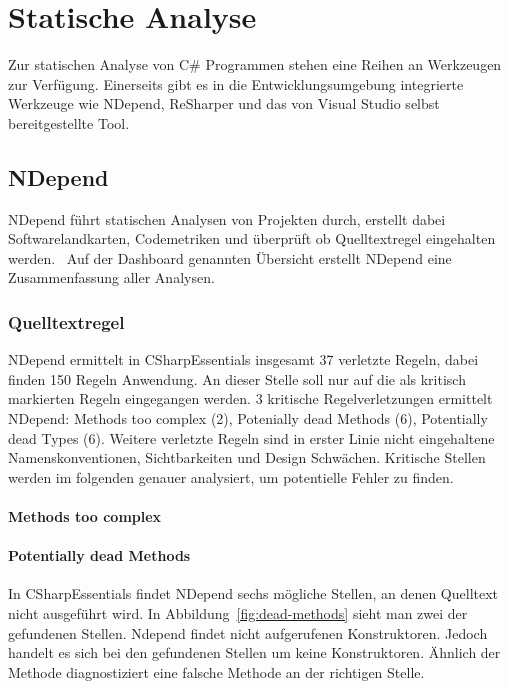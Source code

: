 %
\section{Statische Analyse}
Zur statischen Analyse von C\# Programmen stehen eine Reihen an Werkzeugen zur Verfügung. Einerseits gibt es in die Entwicklungsumgebung integrierte Werkzeuge wie NDepend, ReSharper und das von Visual Studio selbst bereitgestellte Tool.

\subsection{NDepend}
NDepend führt statischen Analysen von Projekten durch, erstellt dabei Softwarelandkarten, Codemetriken und überprüft ob Quelltextregel eingehalten werden.~\cite{ndepend} Auf der Dashboard genannten Übersicht erstellt NDepend eine Zusammenfassung aller Analysen.

\subsubsection{Quelltextregel}
NDepend ermittelt in CSharpEssentials insgesamt 37 verletzte Regeln, dabei finden 150 Regeln Anwendung. An dieser Stelle soll nur auf die als kritisch markierten Regeln eingegangen werden. 3 kritische Regelverletzungen ermittelt NDepend: Methods too complex (2), Potenially dead Methods (6), Potentially dead Types (6). Weitere verletzte Regeln sind in erster Linie nicht eingehaltene Namenskonventionen, Sichtbarkeiten und Design Schwächen. Kritische Stellen werden im folgenden genauer analysiert, um potentielle Fehler zu finden.

\paragraph{Methods too complex}

\paragraph{Potentially dead Methods} In CSharpEssentials findet NDepend sechs mögliche Stellen, an denen Quelltext nicht ausgeführt wird. In Abbildung~\ref{fig:dead-methods} sieht man zwei der gefundenen Stellen. Ndepend findet nicht aufgerufenen Konstruktoren. Jedoch handelt es sich bei den gefundenen Stellen um keine Konstruktoren. Ähnlich der  Methode diagnostiziert eine falsche Methode an der richtigen Stelle. %

